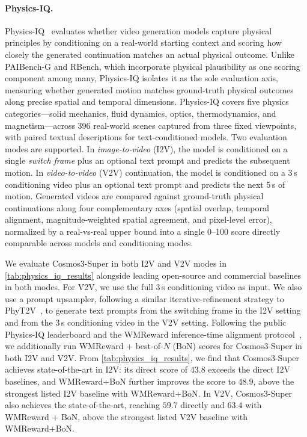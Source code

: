 \paragraph{Physics-IQ.} Physics-IQ~\citep{motamed2025generative} evaluates whether video generation models capture physical principles by conditioning on a real-world starting context and scoring how closely the generated continuation matches an actual physical outcome. Unlike PAIBench-G and RBench, which incorporate physical plausibility as one scoring component among many, Physics-IQ isolates it as the sole evaluation axis, measuring whether generated motion matches ground-truth physical outcomes along precise spatial and temporal dimensions.
Physics-IQ covers five physics categories---solid mechanics, fluid dynamics, optics, thermodynamics, and magnetism---across 396 real-world scenes captured from three fixed viewpoints, with paired textual descriptions for text-conditioned models.
Two evaluation modes are supported.
In \emph{image-to-video} (I2V), the model is conditioned on a single \emph{switch frame} plus an optional text prompt and predicts the subsequent motion.
In \emph{video-to-video} (V2V) continuation, the model is conditioned on a 3\,s conditioning video plus an optional text prompt and predicts the next 5\,s of motion.
Generated videos are compared against ground-truth physical continuations along four complementary axes (spatial overlap, temporal alignment, magnitude-weighted spatial agreement, and pixel-level error), normalized by a real-vs-real upper bound into a single 0–100 score directly comparable across models and conditioning modes.



We evaluate Cosmos3-Super in both I2V and V2V modes in \cref{tab:physics_iq_results} alongside leading open-source and commercial baselines in both modes.
For V2V, we use the full 3\,s conditioning video as input.
We also use a prompt upsampler, following a similar iterative-refinement strategy to PhyT2V~\citep{xue2025phyt2v}, to generate text prompts from the switching frame in the I2V setting and from the 3\,s conditioning video in the V2V setting.
Following the public Physics-IQ leaderboard and the WMReward inference-time alignment protocol~\citep{yuan2026wmreward}, we additionally run WMReward + best-of-$N$ (BoN) scores for Cosmos3-Super in both I2V and V2V.
From \cref{tab:physics_iq_results}, we find that Cosmos3-Super achieves state-of-the-art in I2V: its direct score of $43.8$ exceeds the direct I2V baselines, and WMReward+BoN further improves the score to $48.9$, above the strongest listed I2V baseline with WMReward+BoN.
In V2V, Cosmos3-Super also achieves the state-of-the-art, reaching $59.7$ directly and $63.4$ with WMReward + BoN, above the strongest listed V2V baseline with WMReward+BoN.

